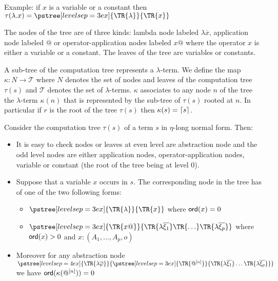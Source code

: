 Example: if $x$ is a variable or a constant then
$ \cmptre{\lambda . x} =
  \pstree[levelsep=3ex]
    { \TR{\lambda } }
    { \TR{x}
    }$

The nodes of the tree are of three kinds: lambda node labeled
 $\lambda \overline{x}$, application node labeled $@$ or
operator-application nodes labeled $x @$ where the operator $x$ is
either a variable or a constant. The leaves of the tree are
variables or constants.

A sub-tree of the computation tree represents a $\lambda$-term. We
define the map $\kappa : N \rightarrow \mathcal{T}$ where $N$
denotes the set of nodes and leaves of the computation tree
$\tau(s)$ and $\mathcal{T}$ denotes the set of $\lambda$-terms.
$\kappa$ associates to any node $n$ of the tree the $\lambda$-term
$\kappa(n)$ that is represented by the sub-tree of $\tau(s)$ rooted
at $n$. In particular if $r$ is the root of the tree $\tau(s)$ then
$\kappa(s) = \lceil s\rceil$.



Consider the computation tree $\tau(s)$ of a term $s$ in $\eta$-long normal form. Then:
\begin{itemize}
\item It is easy to check nodes or leaves at even level are abstraction
node and the odd level nodes are either application nodes,
operator-application nodes, variable or constant (the root of the
tree being at level $0$).

\item Suppose that a variable $x$ occurs in $s$. The corresponding node in the tree has of one of the two following forms:
    \begin{itemize}
    \item $ \pstree[levelsep=3ex]
        { \TR{\lambda } }
        { \TR{x}
        }$ where ${\sf ord}(x) = 0$

    \item $ \pstree[levelsep=3ex]
                { \TR{x @} }
                { \TR{\lambda \overline{\xi_1}} \TR{\ldots} \TR{\lambda \overline{\xi_p}}}
        $ where ${\sf ord}(x) > 0$ and $x:(A_1,\ldots,A_p,o)$
    \end{itemize}

\item    Moreover for any abstraction node
        $ \pstree[levelsep=4ex]
            { \TR{\lambda \overline{\varphi}} }
            { \pstree[levelsep=3ex]
                {\TR{@^{[n]}}}
                {\TR{\lambda \overline{\xi_1}} \ldots \TR{\lambda \overline{\xi_p}}}
            }
        $
    we have ${\sf ord}(\kappa(@^{[n]}))=0$

\end{itemize}

